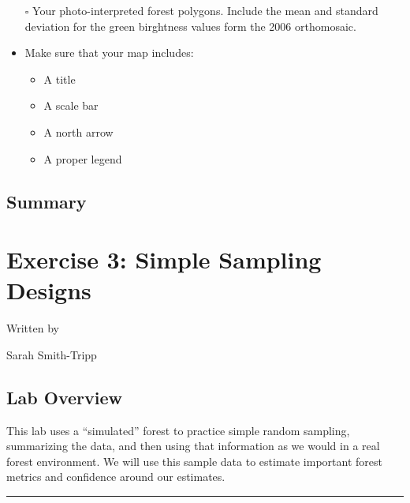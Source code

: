 \documentclass[
  letterpaper,
]{book}
\providecommand{\tightlist}{%
  \setlength{\itemsep}{0pt}\setlength{\parskip}{0pt}}\usepackage{longtable,booktabs,array}
\begin{document}
\begin{itemize}
  \begin{itemize}
  \tightlist
  \item[$\square$]
    Your photo-interpreted forest polygons. Include the mean and
    standard deviation for the green birghtness values form the 2006
    orthomosaic.
  \item
    Make sure that your map includes:

    \begin{itemize}
    \tightlist
    \item
      A title
    \item
      A scale bar
    \item
      A north arrow
    \item
      A proper legend
    \end{itemize}
  \end{itemize}
\end{itemize}

\hypertarget{summary-1}{%
\section*{Summary}\label{summary-1}}



\hypertarget{terrain-spatial-interpolation}{%
\chapter{Exercise 3: Simple Sampling
Designs}\label{terrain-spatial-interpolation}}

Written by

Sarah Smith-Tripp

\hypertarget{lab-overview-2}{%
\section*{Lab Overview}\label{lab-overview-2}}


This lab uses a ``simulated'' forest to practice simple random sampling,
summarizing the data, and then using that information as we would in a
real forest environment. We will use this sample data to estimate
important forest metrics and confidence around our estimates.

\begin{center}\rule{0.5\linewidth}{0.5pt}\end{center}
\end{document}
